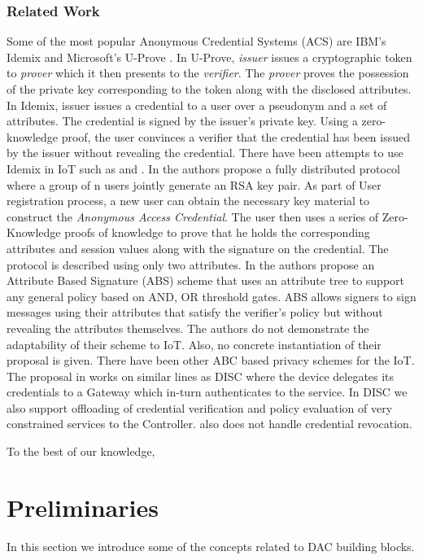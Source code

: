 \documentclass[journal]{IEEEtran}
\begin{document}
\subsubsection{Related Work}
Some of the most popular Anonymous Credential Systems (ACS) are IBM's Idemix \cite{CamenischH02} and Microsoft's U-Prove \citep{uprove}. In U-Prove, \textit{issuer} issues a cryptographic token to \textit{prover} which it then presents to the \textit{verifier}. The \textit{prover} proves the possession of the private key corresponding to the token along with the disclosed attributes. In Idemix, issuer issues a credential to a user over a pseudonym and a set of attributes. The credential is signed by the issuer's private key. Using a zero-knowledge proof, the user convinces a verifier that the credential has been issued by the issuer without revealing the credential. There have been attempts to use Idemix in IoT such as \cite{idemix-iot} and \cite{idemix-iot-keyrock}. In \cite{AlcaidePMR13} the authors propose a fully distributed protocol where a group of n users jointly generate an RSA key pair. As part of User registration process, a new user can obtain the necessary key material to construct the \textit{Anonymous Access Credential}. The user then uses a series of Zero-Knowledge proofs of knowledge to prove that he holds the corresponding attributes and session values along with the signature on the credential. The protocol is described using only two attributes. In \cite{epass} the authors propose an Attribute Based Signature (ABS) scheme that uses an attribute tree to support any general policy based on AND, OR threshold gates. ABS allows signers to sign messages using their attributes that satisfy the verifier's policy but without revealing the attributes themselves. The authors do not demonstrate the adaptability of their scheme to IoT. Also, no concrete instantiation of their proposal is given. There have been other ABC based privacy schemes \cite{abc-iot, rahulamathavan2017privacy, abc-iot-1, gritti2019privacy} for the IoT. The proposal in \cite{gritti2019privacy} works on similar lines as DISC where the device delegates its credentials to a Gateway which in-turn authenticates to the service. In DISC we also support offloading of credential verification and policy evaluation of very constrained services to the Controller. \cite{gritti2019privacy} also does not handle credential revocation.

To the best of our knowledge, 

\section{Preliminaries} \label{preliminaries}
In this section we introduce some of the concepts related to DAC building blocks. 
\end{document}
